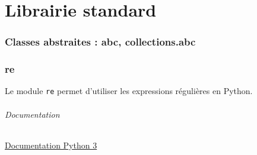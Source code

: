 \documentclass[a4paper, 10pt]{article}
\begin{document}
\newpage

\part{Librairie standard}

\section{Classes abstraites : abc, collections.abc}\label{abc}

\section{re}
Le module \texttt{re} permet d'utiliser les expressions régulières en Python.
\paragraph{Documentation} \href{https://docs.python.org/fr/3/library/re.html}{Documentation Python 3}
\end{document}

